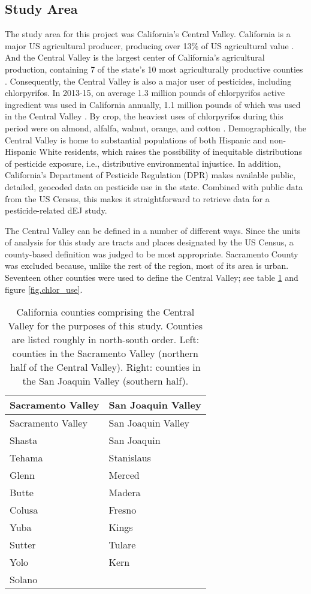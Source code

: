 \documentclass[ijerph,article,submit,oneauthor,pdftex]{Definitions/mdpi}
\begin{document}
\hypertarget{study-area}{%
\subsection{Study Area}\label{study-area}}

The study area for this project was California's Central Valley. California is a major US agricultural producer, producing over 13\% of US agricultural value \citep[p 2]{CaliforniaDepartmentofFoodandAgricultureCaliforniaAgriculturalStatistics2017}. And the Central Valley is the largest center of California's agricultural production, containing 7 of the state's 10 most agriculturally productive counties \citep[p  5]{CaliforniaDepartmentofFoodandAgricultureCaliforniaAgriculturalStatistics2017}. Consequently, the Central Valley is also a major user of pesticides, including chlorpyrifos. In 2013-15, on average 1.3 million pounds of chlorpyrifos active ingredient was used in California annually, 1.1 million pounds of which was used in the Central Valley \citep[table 6]{SegawaEvaluationOptionsInterim2017}.  By crop, the heaviest uses of chlorpyrifos during this period were on almond, alfalfa, walnut, orange, and cotton \citep[table 4]{SegawaEvaluationOptionsInterim2017}.  Demographically, the Central Valley is home to substantial populations of both Hispanic and non-Hispanic White residents, which raises the possibility of inequitable distributions of pesticide exposure, i.e., distributive environmental injustice. In addition, California's Department of Pesticide Regulation (DPR) makes available public, detailed, geocoded data on pesticide use in the state. Combined with public data from the US Census, this makes it straightforward to retrieve data for a pesticide-related dEJ study.

The Central Valley can be defined in a number of different ways. Since the units of analysis for this study are tracts and places designated by the US Census, a county-based definition was judged to be most appropriate. Sacramento County was excluded because, unlike the rest of the region, most of its area is urban. Seventeen other counties were used to define the Central Valley; see table \ref{tab.counties} and figure \ref{fig.chlor_use}.

\begin{longtable}[]{@{}ll@{}}
\caption{California counties comprising the Central Valley for the purposes of this study. Counties are listed roughly in north-south order. Left: counties in the Sacramento Valley (northern half of the Central Valley). Right: counties in the San Joaquin Valley (southern half).\label{tab.counties}}\tabularnewline
\toprule
Sacramento Valley & San Joaquin Valley\tabularnewline
\midrule
\endfirsthead
\toprule
Sacramento Valley & San Joaquin Valley\tabularnewline
\midrule
\endhead
Shasta & San Joaquin\tabularnewline
Tehama & Stanislaus\tabularnewline
Glenn & Merced\tabularnewline
Butte & Madera\tabularnewline
Colusa & Fresno\tabularnewline
Yuba & Kings\tabularnewline
Sutter & Tulare\tabularnewline
Yolo & Kern\tabularnewline
Solano &\tabularnewline
\bottomrule
\end{longtable}
\end{document}
